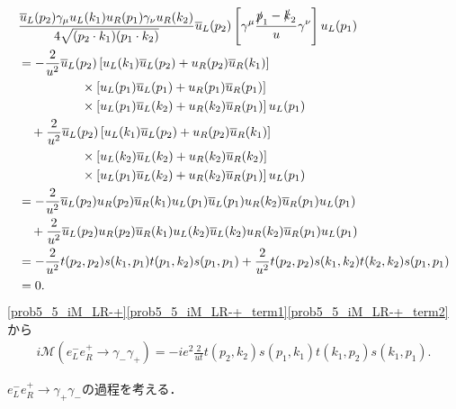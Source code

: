 \begin{align}
  \begin{split}
    & \frac{\overline{u}_L(p_2)\gamma_\mu u_L(k_1) u_R(p_1)\gamma_\nu u_R(k_2)}{4\sqrt{(p_2 \cdot k_1)(p_1 \cdot k_2)}} \overline{u}_L(p_2)
    \left[ \gamma^\mu \frac{\slashed{p}_1 - \slashed{k}_2}{u} \gamma^\nu \right] u_L(p_1) \\
    &= -\frac{2}{u^2} \overline{u}_L(p_2) \left[ u_L(k_1)\overline{u}_L(p_2) + u_R(p_2)\overline{u}_R(k_1) \right] \\
    &\qquad\qquad\quad\times \left[ u_L(p_1)\overline{u}_L(p_1) + u_R(p_1)\overline{u}_R(p_1) \right] \\
    &\qquad\qquad\quad\times \left[ u_L(p_1)\overline{u}_L(k_2) + u_R(k_2)\overline{u}_R(p_1) \right] u_L(p_1) \\
    &\quad +\frac{2}{u^2} \overline{u}_L(p_2) \left[ u_L(k_1)\overline{u}_L(p_2) + u_R(p_2)\overline{u}_R(k_1) \right] \\
    &\qquad\qquad\quad\times \left[ u_L(k_2)\overline{u}_L(k_2) + u_R(k_2)\overline{u}_R(k_2) \right] \\
    &\qquad\qquad\quad\times \left[ u_L(p_1)\overline{u}_L(k_2) + u_R(k_2)\overline{u}_R(p_1) \right] u_L(p_1) \\
    &= -\frac{2}{u^2} \overline{u}_L(p_2) u_R(p_2)\overline{u}_R(k_1) u_L(p_1)\overline{u}_L(p_1) u_R(k_2)\overline{u}_R(p_1) u_L(p_1) \\
    &\quad +\frac{2}{u^2} \overline{u}_L(p_2) u_R(p_2)\overline{u}_R(k_1) u_L(k_2)\overline{u}_L(k_2) u_R(k_2)\overline{u}_R(p_1) u_L(p_1) \\
    &= -\frac{2}{u^2} t(p_2, p_2) s(k_1, p_1) t(p_1, k_2) s(p_1, p_1) + \frac{2}{u^2} t(p_2, p_2) s(k_1, k_2) t(k_2, k_2) s(p_1, p_1) \\
    &= 0 .
  \end{split}
  \label{prob5_5_iM_LR-+_term2}
\end{align}
\eqref{prob5_5_iM_LR-+}\eqref{prob5_5_iM_LR-+_term1}\eqref{prob5_5_iM_LR-+_term2}から
\begin{align}
  i\mathcal{M}(e^-_L e^+_R \to \gamma_-\gamma_+) = -ie^2 \frac{2}{ut} t(p_2, k_2) s(p_1, k_1) t(k_1, p_2) s(k_1, p_1) . \label{prob5_5_iM_LR-+_cal}
\end{align}

$e^-_L e^+_R \to \gamma_+\gamma_-$の過程を考える．

